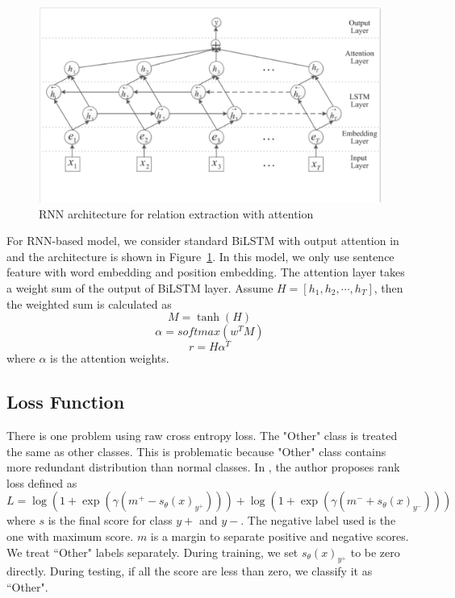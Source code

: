 \documentclass[a4paper]{article}
\begin{document}
\begin{spacing}{1.0}
  \begin{figure}
    \centering
    \includegraphics[width=\linewidth]{rnn_attention}
    \caption{RNN architecture for relation extraction with attention \cite{Zhou2016AttentionBasedBL}}
    \label{fig:rnn_attention}
  \end{figure}
  For RNN-based model, we consider standard BiLSTM with output attention in \cite{Zhou2016AttentionBasedBL} and the architecture is shown in Figure~\ref{fig:rnn_attention}. In this model, we only use sentence feature with word embedding and position embedding. The attention layer takes a weight sum of the output of BiLSTM layer. Assume $H=[h_1,h_2,\cdots, h_T]$, then the weighted sum is calculated as 
  \begin{equation}
  M=\tanh(H)
  \end{equation}
  \begin{equation}
  \alpha=softmax(w^TM)
  \end{equation}
  \begin{equation}
  r=H\alpha^T
  \end{equation}
  where $\alpha$ is the attention weights.
  
  \subsection{Loss Function}
  There is one problem using raw cross entropy loss. The "Other" class is treated the same as other classes. This is problematic because "Other" class contains more redundant distribution than normal classes. In \cite{cnn_rank_loss}, the author proposes rank loss defined as 
  \begin{equation}
  L=\log(1+\exp(\gamma(m^{+}-s_{\theta}(x)_{y^+}))) + \log(1+\exp(\gamma(m^{-}+s_{\theta}(x)_{y^-})))
  \end{equation}
  where $s$ is the final score for class $y+$ and $y-$. The negative label used is the one with maximum score. $m$ is a margin to separate positive and negative scores. We treat ``Other" labels separately. During training, we set $s_{\theta}(x)_{y^+}$ to be zero directly. During testing, if all the score are less than zero, we classify it as ``Other".
  

\end{spacing}
\end{document}
